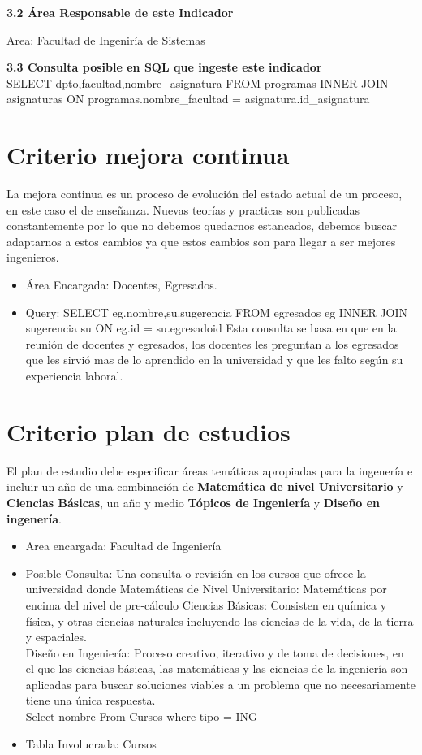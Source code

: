 \documentclass[12pt,a4paper]{report}
\begin{document}
\textbf{3.2 Área Responsable de este Indicador}

 Area: Facultad de Ingeniría de Sistemas

\textbf{3.3 Consulta posible en SQL que ingeste este indicador}\\

SELECT dpto,facultad,nombre\_asignatura FROM programas INNER JOIN asignaturas ON programas.nombre\_facultad = asignatura.id\_asignatura


\section{ Criterio mejora continua}
La mejora continua es un proceso de evolución del estado actual de un proceso, en este caso el de enseñanza. Nuevas teorías y practicas son publicadas constantemente por lo que no debemos quedarnos estancados, debemos buscar adaptarnos a estos cambios ya que estos cambios son para llegar a ser mejores ingenieros.

\begin{itemize}
\item Área Encargada: Docentes, Egresados.
\item Query: SELECT eg.nombre,su.sugerencia FROM egresados eg INNER JOIN sugerencia su ON eg.id = su.egresadoid
Esta consulta se basa en que en la reunión de docentes y egresados, los docentes les preguntan a los egresados que les sirvió mas de lo aprendido en la universidad y que les falto según su experiencia laboral.
\end{itemize}

\section{ Criterio plan de estudios}
El plan de estudio debe especificar áreas temáticas apropiadas para la ingenería e incluir un año de una combinación de \textbf{Matemática de nivel Universitario} y \textbf{Ciencias Básicas}, un año y medio \textbf{Tópicos de Ingeniería} y \textbf{Diseño en ingenería}.

\begin{itemize}
\item Area encargada: Facultad de Ingeniería

\item Posible Consulta: Una consulta o revisión en los cursos que ofrece la universidad donde Matemáticas de Nivel Universitario: Matemáticas por encima del nivel de pre-cálculo
Ciencias Básicas: Consisten en química y física, y otras ciencias naturales incluyendo las ciencias de la vida, de la tierra y espaciales.\\
Diseño en Ingeniería: Proceso creativo, iterativo y de toma de decisiones, en el que las ciencias básicas, las matemáticas y las ciencias de la ingeniería son aplicadas para buscar soluciones viables a un problema que no necesariamente tiene una única respuesta.\\
Select nombre From Cursos where tipo = ING

\item Tabla Involucrada: Cursos
\end{itemize}
\end{document}
